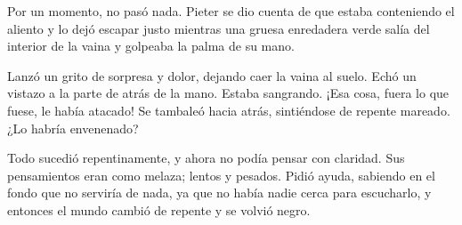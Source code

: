Por un momento, no pasó nada. Pieter se dio cuenta de que estaba conteniendo el aliento y lo dejó escapar justo mientras una gruesa enredadera verde salía del interior de la vaina y golpeaba la palma de su mano.



Lanzó un grito de sorpresa y dolor, dejando caer la vaina al suelo. Echó un vistazo a la parte de atrás de la mano. Estaba sangrando. ¡Esa cosa, fuera lo que fuese, le había atacado! Se tambaleó hacia atrás, sintiéndose de repente mareado. ¿Lo habría envenenado?



Todo sucedió repentinamente, y ahora no podía pensar con claridad. Sus pensamientos eran como melaza; lentos y pesados. Pidió ayuda, sabiendo en el fondo que no serviría de nada, ya que no había nadie cerca para escucharlo, y entonces el mundo cambió de repente y se volvió negro.

